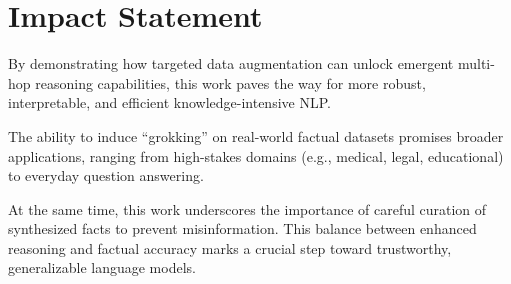 \section*{Impact Statement}

    By demonstrating how targeted data augmentation can unlock emergent multi-hop reasoning capabilities, this work paves the way for more robust, interpretable, and efficient knowledge-intensive NLP. 

    The ability to induce “grokking” on real-world factual datasets promises broader applications, ranging from high-stakes domains (e.g., medical, legal, educational) to everyday question answering. 
    
    At the same time, this work underscores the importance of careful curation of synthesized facts to prevent misinformation. This balance between enhanced reasoning and factual accuracy marks a crucial step toward trustworthy, generalizable language models.

